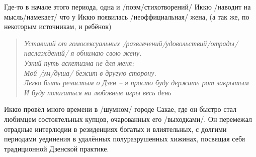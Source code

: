 \begin{ver}
Где-то в начале этого периода, одна и /поэм/стихотворений/ Иккю
/наводит на мысль/намекает/ что у Иккю появилась
/неоффициальная/
жена, (а так же, по некоторым источникам, и ребёнок)
\end{ver}

\begin{ver}
\begin{verse}\it
  Уставший от гомосексуальных
  /развлечений/удовольствий/отрады/наслаждений/ я обнимаю свою жену.\\
  Узкий путь аскетизма не для меня;\\
  Мой /ум/душа/ бежит в другую сторону.\\
  Легко быть речистым о Дзен -- я просто буду держать рот закрытым\\
  И буду полагаться на любовные игры весь день
\end{verse}
\end{ver}

\begin{ver}
  Иккю провёл много времени в /шумном/ городе Сакае,
  где он быстро стал любимцем состоятельных купцов, очарованных его
  /выходками/. Он перемежал отрадные интерлюдии в
  резиденциях богатых и влиятельных, с долгими периодами уединения в
  удалённых полуразрушенных хижинах, посвящая себя традиционной
  Дзенской практике.
\end{ver}
